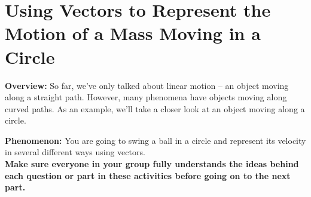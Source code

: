 \section[Representing the Motion of a Mass along a Circle]{Using Vectors to Represent the Motion of a Mass Moving in a Circle}
\label{act6.1.4}

\begin{overview}

\textbf{Overview:} So far, we've only talked about linear motion -- an object moving along a straight path. However, many phenomena have objects moving along curved paths. As an example, we'll take a closer look at an object moving along a circle.

\end{overview}

\noindent\textbf{Phenomenon:} You are going to swing a ball in a circle and represent its velocity in several different ways using vectors.\\

\noindent\textbf{Make sure everyone in your group fully understands the ideas behind each question or part in these activities before going on to the next part.}


